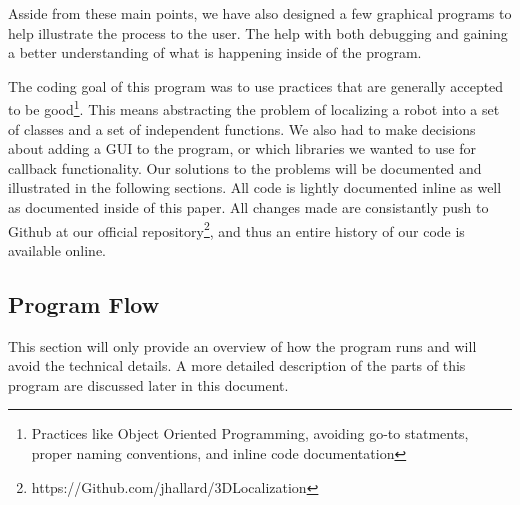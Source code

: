\documentclass[a4paper,11pt]{article}
\begin{document}
  Asside from these main points, we have also designed a few graphical programs to help illustrate the process to the user. The help with both debugging and gaining a better understanding of what is happening inside of the program.

  The coding goal of this program was to use practices that are generally accepted to be good\footnote{Practices like Object Oriented Programming, avoiding go-to statments, proper naming conventions, and inline code documentation}. This means abstracting the problem of localizing a robot into a set of classes and a set of independent functions. We also had to make decisions about adding a GUI to the program, or which libraries we wanted to use for callback functionality. Our solutions to the problems will be documented and illustrated in the following sections. All code is lightly documented inline as well as documented inside of this paper. All changes made are consistantly push to Github at our official repository\footnote{https://Github.com/jhallard/3DLocalization}, and thus an entire history of our code is available online.
  
  \subsection{Program Flow}
  This section will only provide an overview of how the program runs and will avoid the technical details. A more detailed description of the parts of this program are discussed later in this document.
  
\end{document}
